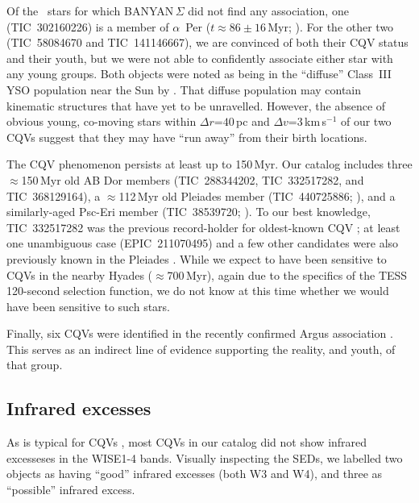 \documentclass[11pt,twocolumn,tighten]{aastex63}
\begin{document}
Of the \ngoodsfieldbanyan\ stars for which BANYAN\,$\Sigma$ did not
find any association, one (TIC~302160226) is a member of $\alpha$~Per
($t\approx 86\pm16$\,Myr;
\citealt{2021A&A...645A..84M,2022arXiv221109822B}).  For the other two
(TIC~58084670 and TIC~141146667), we are convinced of both their CQV
status and their youth, but we were not able to confidently associate
either star with any young groups.  Both objects were noted as being in the
``diffuse'' Class~III YSO population near the Sun by \citet{2021ApJ...917...23K}.
That diffuse population may contain kinematic structures that have yet
to be unravelled.  However, the absence of obvious young, co-moving
stars within $\Delta r$=$40$\,pc and $\Delta v$=$3$\,km\,s$^{-1}$ of
our two CQVs suggest that they may have ``run away'' from their birth
locations.

The CQV phenomenon persists at least up to 150\,Myr.  Our catalog
includes three $\approx$150\,Myr old AB Dor members (TIC~288344202,
TIC~332517282, and TIC~368129164), a $\approx$112\,Myr old Pleiades
member (TIC~440725886; \citealt{CantatGaudin_2020}), and a
similarly-aged Psc-Eri member (TIC~38539720;
\citealt{2020A&A...639A..64R}).  To our best knowledge, TIC~332517282
was the previous record-holder for oldest-known CQV
\citep{2019ApJ...876..127Z,2022AJ....163..144G}; at least one
unambiguous case (EPIC~211070495) and a few other candidates were also
previously known in the Pleiades \citep{2016AJ....152..114R}.  While
we expect to have been sensitive to CQVs in the nearby Hyades
($\approx$700\,Myr), again due to the specifics of the TESS 120-second
selection function, we do not know at this time whether we would have
been sensitive to such stars.

Finally, six CQVs were identified in the recently confirmed Argus
association \citep{2019ApJ...870...27Z}.  This serves as an indirect
line of evidence supporting the reality, and youth, of that group.


\subsection{Infrared excesses}

As is typical for CQVs \citep{2017AJ....153..152S}, most CQVs in our
catalog did not show infrared excesseses in the WISE1-4 bands.
Visually inspecting the SEDs, we labelled two objects as having
``good'' infrared excesses (both W3 and W4), and three as ``possible''
infrared excess.
\end{document}
